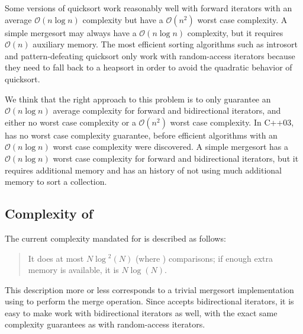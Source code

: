 \documentclass{isocpp_proposal}
\begin{document}
Some versions of quicksort work reasonably well with forward iterators with an average $\mathcal{O}(n \log{} n)$ complexity but have a $\mathcal{O}(n^2)$ worst case complexity. A simple mergesort may always have a $\mathcal{O}(n \log{} n)$ complexity, but it requires $\mathcal{O}(n)$ auxiliary memory. The most efficient sorting algorithms such as introsort \cite{introsort} and pattern-defeating quicksort \cite{pdqsort} only work with random-access iterators because they need to fall back to a heapsort in order to avoid the quadratic behavior of quicksort.

\vspace{0.3cm}

We think that the right approach to this  problem is to only guarantee an $\mathcal{O}(n \log{} n)$ average complexity for forward and bidirectional iterators, and either no worst case complexity or a $\mathcal{O}(n^2)$ worst case complexity. In C++03,  has no worst case complexity guarantee, before efficient algorithms with an $\mathcal{O}(n \log{} n)$ worst case complexity were discovered. A simple mergesort has a $\mathcal{O}(n \log{} n)$ worst case complexity for forward and bidirectional iterators, but it requires additional memory and  has an history of not using much additional memory to sort a collection.

\subsection{Complexity of }

The current complexity mandated for  is described as follows: 

\begin{quotation}
It does at most $N \log{}^2 (N)$ (where ) comparisons; if enough extra memory is available, it is  $N \log{} (N)$.
\end{quotation}

This description more or less corresponds to a trivial mergesort implementation using  to perform the merge operation. Since  accepts bidirectional iterators, it is easy to make  work with bidirectional iterators as well, with the exact same complexity guarantees as with random-access iterators.

\vspace{0.3cm}
\end{document}

